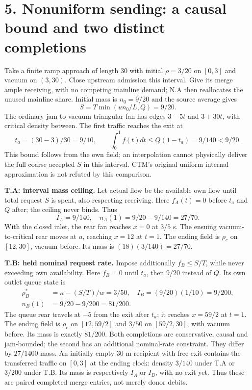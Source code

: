 \documentclass[11pt,a4paper]{article}
\begin{document}
\section*{5. Nonuniform sending: a causal bound and two distinct completions}
Take a finite ramp approach of length 30 with initial $\rho=3/20$ on
$[0,3]$ and vacuum on $(3,30)$. Close upstream admission this interval.
Give its merge ample receiving, with no competing mainline demand; N.A then
reallocates the unused mainline share. Initial mass is $n_0=9/20$ and
the source average gives
\begin{equation}
 S=T\min(u n_0/L,Q)=9/20.
\end{equation}
The ordinary jam-to-vacuum triangular fan has edges $3-5t$ and $3+30t$,
with critical density between. The first traffic reaches the exit at
\begin{equation}
 t_a=(30-3)/30=9/10,\qquad
 \int_0^1 f(t)dt\le Q(1-t_a)=9/140<9/20.
\end{equation}
This bound follows from the own field; an interpolation cannot physically
deliver the full coarse accepted $S$ in this interval. CTM's original uniform
internal approximation is not refuted by this comparison.

\textbf{T.A: interval mass ceiling.} Let actual flow be the available own
flow until total request $S$ is spent, also respecting receiving. Here
$f_A(t)=0$ before $t_a$ and $Q$ after; the ceiling never binds. Thus
\begin{equation}
 I_A=9/140,\quad n_A(1)=9/20-9/140=27/70.
\end{equation}
With the closed inlet, the rear fan reaches $x=0$ at $3/5$ s. The ensuing
vacuum-to-critical rear moves at $u$, reaching $x=12$ at $t=1$. The ending
field is $\rho_c$ on $[12,30]$, vacuum before. Its mass is $(18)(3/140)=27/70$.

\textbf{T.B: held nominal request rate.} Impose additionally $f_B\le S/T$,
while never exceeding own availability. Here $f_B=0$ until $t_a$, then
$9/20$ instead of $Q$. Its own outlet queue state is
\begin{align}
 \rho_B^*&=\kappa-(S/T)/w=3/50,\quad
 I_B=(9/20)(1/10)=9/200,\\
 n_B(1)&=9/20-9/200=81/200.
\end{align}
The queue rear travels at $-5$ from the exit after $t_a$; it reaches
$x=59/2$ at $t=1$. The ending field is $\rho_c$ on $[12,59/2]$ and
$3/50$ on $[59/2,30]$, with vacuum before. Its mass is exactly $81/200$.
Both completions are conservative, causal and jam-bounded; the second has
an additional nominal-rate constraint. They differ by $27/1400$ mass.
An initially empty 30 m recipient with free exit contains the transferred
traffic on $[0,3]$ at the ending clock: density $3/140$ under T.A or $3/200$
under T.B. Its mass is respectively $I_A$ or $I_B$, with no exit yet. Thus
these are paired completed merge entries, not merely donor debits.
\end{document}
